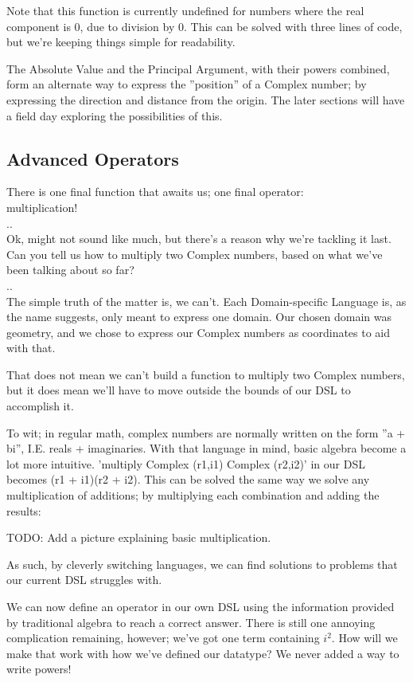 Note that this function is currently undefined for numbers where the real component is 0, due to division by 0. This can be solved with three lines of code, but we're keeping things simple for readability.

The Absolute Value and the Principal Argument, with their powers combined, form an alternate way to express the ''position'' of a Complex number; by expressing the direction and distance from the origin. The later sections will have a field day exploring the possibilities of this.

\subsection{Advanced Operators}

There is one final function that awaits us; one final operator:\\ multiplication!\\
..\\
Ok, might not sound like much, but there's a reason why we're tackling it last.\\
Can you tell us how to multiply two Complex numbers, based on what we've been talking about so far?\\
..\\
The simple truth of the matter is, we can't. Each Domain-specific Language is, as the name suggests, only meant to express one domain. Our chosen domain was geometry, and we chose to express our Complex numbers as coordinates to aid with that.

That does not mean we can't build a function to multiply two Complex numbers, but it does mean we'll have to move outside the bounds of our DSL to accomplish it.

To wit; in regular math, complex numbers are normally written on the form ''a + bi'', I.E. reals + imaginaries. With that language in mind, basic algebra become a lot more intuitive. 'multiply Complex (r1,i1) Complex (r2,i2)' in our DSL becomes (r1 + i1)(r2 + i2). This can be solved the same way we solve any multiplication of additions; by multiplying each combination and adding the results:

TODO: Add a picture explaining basic multiplication.

As such, by cleverly switching languages, we can find solutions to problems that our current DSL struggles with.

We can now define an operator in our own DSL using the information provided by traditional algebra to reach a correct answer. There is still one annoying complication remaining, however; we've got one term containing $i^2$. How will we make that work with how we've defined our datatype? We never added a way to write powers!

